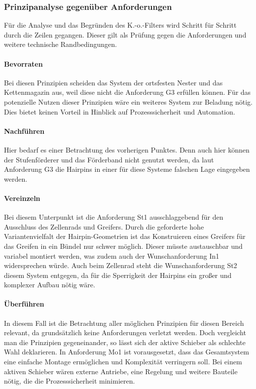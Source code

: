 \subsubsection{Prinzipanalyse gegenüber Anforderungen}\label{sec:Prinzipanalyse}
Für die Analyse und das Begründen des K.-o.-Filters wird Schritt für Schritt durch die Zeilen gegangen. Dieser gilt als Prüfung gegen die
Anforderungen und weitere technische Randbedingungen.

\paragraph{Bevorraten} Bei diesen Prinzipien scheiden das System der ortsfesten Nester und das Kettenmagazin aus, weil diese
nicht die Anforderung G3 erfüllen können. Für das potenzielle Nutzen dieser Prinzipien wäre ein weiteres System zur Beladung
nötig. Dies bietet keinen Vorteil in Hinblick auf Prozesssicherheit und Automation.

\paragraph{Nachführen} Hier bedarf es einer Betrachtung des vorherigen Punktes. Denn auch hier können der Stufenförderer und das
Förderband nicht genutzt werden, da laut Anforderung G3 die Hairpins in einer für diese Systeme falschen Lage eingegeben werden.

\paragraph{Vereinzeln} Bei diesem Unterpunkt ist die Anforderung St1 ausschlaggebend für den Ausschluss des Zellenrads und Greifers.
Durch die geforderte hohe Variantenvielfalt der Hairpin-Geometrien ist das Konstruieren eines Greifers für das Greifen in ein Bündel nur schwer möglich. Dieser müsste
austauschbar und variabel montiert werden, was zudem auch der Wunschanforderung In1 widersprechen würde. Auch beim Zellenrad steht
die Wunschanforderung St2 diesem System entgegen, da für die Sperrigkeit der Hairpins ein großer und komplexer Aufbau nötig wäre.

\paragraph{Überführen} In diesem Fall ist die Betrachtung aller möglichen Prinzipien für diesen Bereich relevant, da grundsätzlich
keine Anforderungen verletzt werden. Doch vergleicht man die Prinzipien gegeneinander, so lässt sich der aktive Schieber als schlechte
Wahl deklarieren. In Anforderung Mo1 ist vorausgesetzt, dass das Gesamtsystem eine einfache Montage ermöglichen und Komplexität
verringern soll. Bei einem aktiven Schieber wären externe Antriebe, eine Regelung und weitere Bauteile nötig, die die Prozesssicherheit
minimieren.

